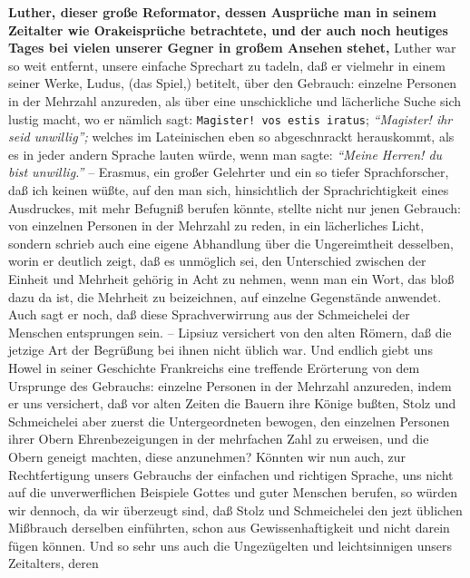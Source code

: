 \textbf{Luther, dieser große Reformator, dessen
Ausprüche man in seinem Zeitalter
wie Orakeisprüche betrachtete, und der auch noch heutiges Tages bei vielen
unserer Gegner in großem Ansehen stehet,} Luther
war so weit entfernt, unsere
einfache Sprechart zu tadeln, daß er vielmehr in einem seiner Werke,
Ludus, (das
Spiel,) betitelt, über den Gebrauch: einzelne Personen in der Mehrzahl
anzureden, als über eine unschickliche und lächerliche Suche sich lustig macht,
wo er nämlich sagt: \texttt{Magister! vos estis iratus}; \textit{"`Magister! ihr
seid
unwillig"';} welches im Lateinischen eben so abgeschnrackt
herauskommt, als es in
jeder andern Sprache lauten würde, wenn man sagte:
\textit{"`Meine Herren! du bist unwillig."'} --
Erasmus, ein großer Gelehrter und ein so tiefer
Sprachforscher,
daß ich keinen wüßte, auf den man sich, hinsichtlich der Sprachrichtigkeit eines
Ausdruckes, mit mehr Befugniß berufen könnte, stellte nicht nur jenen Gebrauch:
von einzelnen Personen in der Mehrzahl zu reden, in ein lächerliches Licht,
sondern schrieb auch eine eigene Abhandlung über die Ungereimtheit desselben,
worin er deutlich zeigt, daß es unmöglich sei, den Unterschied zwischen der
Einheit und Mehrheit gehörig in Acht zu nehmen, wenn man ein Wort, das bloß dazu
da ist, die Mehrheit zu beizeichnen, auf einzelne Gegenstände anwendet. Auch
sagt er noch, daß diese Sprachverwirrung aus der Schmeichelei der Menschen
entsprungen sein. -- Lipsiuz versichert von den alten
Römern, daß die jetzige Art
der Begrüßung bei ihnen nicht üblich war. Und endlich giebt uns
Howel in seiner
Geschichte Frankreichs eine treffende Erörterung von dem Ursprunge des
Gebrauchs: einzelne Personen in der Mehrzahl anzureden, indem er uns versichert,
daß vor alten Zeiten die Bauern ihre
Könige bußten, Stolz und Schmeichelei aber
zuerst die Untergeordneten bewogen, den einzelnen Personen ihrer Obern
Ehrenbezeigungen in der mehrfachen Zahl zu erweisen, und die Obern geneigt
machten, diese anzunehmen? Könnten wir nun auch, zur Rechtfertigung unsers
Gebrauchs der einfachen und richtigen Sprache, uns nicht auf die unverwerflichen
Beispiele Gottes und guter Menschen berufen, so würden wir dennoch, da wir
überzeugt sind, daß Stolz und Schmeichelei den jezt üblichen Mißbrauch derselben
einführten, schon aus Gewissenhaftigkeit und nicht darein fügen können. Und so
sehr uns auch die Ungezügelten und leichtsinnigen unsers Zeitalters, deren
